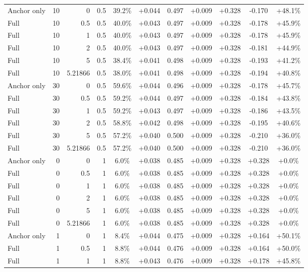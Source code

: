 \begin{table}[htbp]
\begin{tabular}{lrrrccccccc}
Anchor only & 10 & 0 & 0.5 & 39.2\% & +0.044 & 0.497 & +0.009 & +0.328 & -0.170 & +48.1\% \\
Full & 10 & 0.5 & 0.5 & 40.0\% & +0.043 & 0.497 & +0.009 & +0.328 & -0.178 & +45.9\% \\
Full & 10 & 1 & 0.5 & 40.0\% & +0.043 & 0.497 & +0.009 & +0.328 & -0.178 & +45.9\% \\
Full & 10 & 2 & 0.5 & 40.0\% & +0.043 & 0.497 & +0.009 & +0.328 & -0.181 & +44.9\% \\
Full & 10 & 5 & 0.5 & 38.4\% & +0.041 & 0.498 & +0.009 & +0.328 & -0.193 & +41.2\% \\
Full & 10 & 5.21866 & 0.5 & 38.0\% & +0.041 & 0.498 & +0.009 & +0.328 & -0.194 & +40.8\% \\
Anchor only & 30 & 0 & 0.5 & 59.6\% & +0.044 & 0.496 & +0.009 & +0.328 & -0.178 & +45.7\% \\
Full & 30 & 0.5 & 0.5 & 59.2\% & +0.044 & 0.497 & +0.009 & +0.328 & -0.184 & +43.8\% \\
Full & 30 & 1 & 0.5 & 59.2\% & +0.043 & 0.497 & +0.009 & +0.328 & -0.186 & +43.5\% \\
Full & 30 & 2 & 0.5 & 58.8\% & +0.042 & 0.498 & +0.009 & +0.328 & -0.195 & +40.6\% \\
Full & 30 & 5 & 0.5 & 57.2\% & +0.040 & 0.500 & +0.009 & +0.328 & -0.210 & +36.0\% \\
Full & 30 & 5.21866 & 0.5 & 57.2\% & +0.040 & 0.500 & +0.009 & +0.328 & -0.210 & +36.0\% \\
Anchor only & 0 & 0 & 1 & 6.0\% & +0.038 & 0.485 & +0.009 & +0.328 & +0.328 & +0.0\% \\
Full & 0 & 0.5 & 1 & 6.0\% & +0.038 & 0.485 & +0.009 & +0.328 & +0.328 & +0.0\% \\
Full & 0 & 1 & 1 & 6.0\% & +0.038 & 0.485 & +0.009 & +0.328 & +0.328 & +0.0\% \\
Full & 0 & 2 & 1 & 6.0\% & +0.038 & 0.485 & +0.009 & +0.328 & +0.328 & +0.0\% \\
Full & 0 & 5 & 1 & 6.0\% & +0.038 & 0.485 & +0.009 & +0.328 & +0.328 & +0.0\% \\
Full & 0 & 5.21866 & 1 & 6.0\% & +0.038 & 0.485 & +0.009 & +0.328 & +0.328 & +0.0\% \\
Anchor only & 1 & 0 & 1 & 8.4\% & +0.044 & 0.475 & +0.009 & +0.328 & +0.164 & +50.1\% \\
Full & 1 & 0.5 & 1 & 8.8\% & +0.044 & 0.476 & +0.009 & +0.328 & +0.164 & +50.0\% \\
Full & 1 & 1 & 1 & 8.8\% & +0.043 & 0.476 & +0.009 & +0.328 & +0.178 & +45.8\% \\

\end{tabular}
\end{table}
